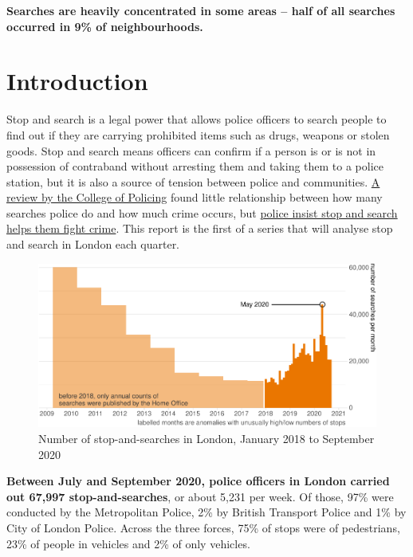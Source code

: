 \documentclass[
  a4paper,
  twoside, 11pt]{article}
\begin{document}
\textbf{\sffamily Searches are heavily concentrated in some areas -- half of all searches occurred in 9\% of neighbourhoods.}

\hypertarget{introduction}{%
\section{Introduction}\label{introduction}}

Stop and search is a legal power that allows police officers to search people to find out if they are carrying prohibited items such as drugs, weapons or stolen goods. Stop and search means officers can confirm if a person is or is not in possession of contraband without arresting them and taking them to a police station, but it is also a source of tension between police and communities. \href{https://whatworks.college.police.uk/Research/Documents/SS_and_crime_report.pdf}{A review by the College of Policing} found little relationship between how many searches police do and how much crime occurs, but \href{https://www.met.police.uk/advice/advice-and-information/st-s/stop-and-search/why-we-use-stop-and-search/}{police insist stop and search helps them fight crime}. This report is the first of a series that will analyse stop and search in London each quarter.



\begin{figure}[bh]

{\centering \includegraphics{2020-Q3_files/figure-latex/chart-trend-overall-1} 

}

\caption{Number of stop-and-searches in London, January 2018 to September 2020}\label{fig:chart-trend-overall}
\end{figure}

\textbf{Between July and September 2020, police officers in London carried out 67,997 stop-and-searches}, or about 5,231 per week. Of those, 97\% were conducted by the Metropolitan Police, 2\% by British Transport Police and 1\% by City of London Police. Across the three forces, 75\% of stops were of pedestrians, 23\% of people in vehicles and 2\% of only vehicles.
\end{document}
